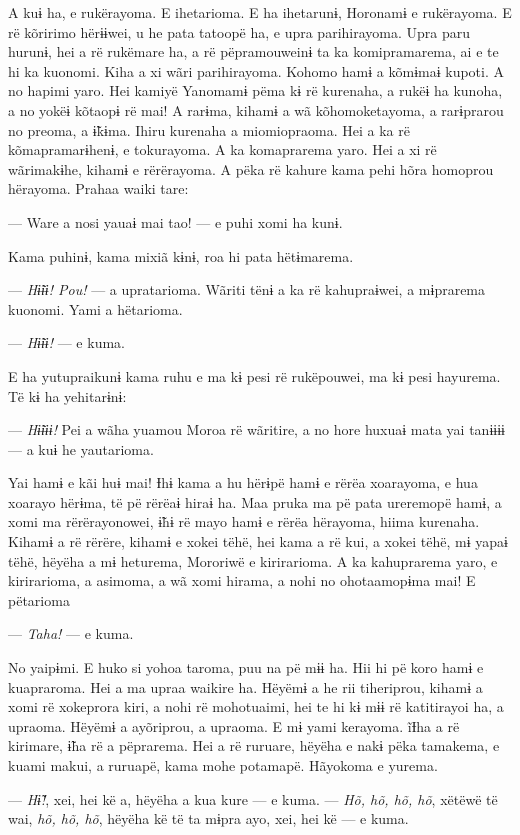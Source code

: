 A kuɨ ha, e rukërayoma. E ihetarioma. E ha ihetarunɨ, Horonamɨ e
rukërayoma. E rë kõririmo hërɨɨwei, u he pata tatoopë ha, e upra
parihirayoma. Upra paru hurunɨ, hei a rë rukëmare ha, a rë pëpramouweinɨ
ta ka komipramarema, ai e te hi ka kuonomi. Kiha a xi wãri parihirayoma.
Kohomo hamɨ a kõmɨmaɨ kupoti. A no hapimi yaro. Hei kamiyë Yanomamɨ pëma
kɨ rë kurenaha, a rukëɨ ha kunoha, a no yokëɨ kõtaopɨ rë mai! A rarɨma,
kihamɨ a wã kõhomoketayoma, a rarɨprarou no preoma, a ɨ̃kɨma. Ihiru
kurenaha a miomiopraoma. Hei a ka rë kõmapramarɨhenɨ, e tokurayoma. A ka
komaprarema yaro. Hei a xi rë wãrimakɨhe, kihamɨ e rërërayoma. A pëka rë
kahure kama pehi hõra homoprou hërayoma. Prahaa waiki tare: 

--- Ware a nosi yauaɨ mai tao! --- e puhi xomi ha kunɨ. 

Kama puhinɨ, kama mixiã kɨnɨ, roa hi pata hëtɨmarema. 

--- \textit{Hɨ̃ɨɨ! Pou!} --- a upratarioma. Wãriti tënɨ a ka rë kahupraɨwei, a
mɨprarema kuonomi. Yami a hëtarioma. 

--- \textit{Hɨ̃ɨɨ!} --- e kuma. 

E ha yutupraikunɨ kama ruhu e ma kɨ pesi rë rukëpouwei, ma kɨ pesi
hayurema. Të kɨ ha yehitarɨnɨ: 

--- \textit{Hɨ̃ɨɨɨ!} Pei a wãha yuamou Moroa rë wãritire, a no hore huxuaɨ mata yai
tanɨɨɨɨ --- a kuɨ he yautarioma. 

Yai hamɨ e kãi huɨ mai! Ɨhɨ kama a hu hërɨpë hamɨ e rërëa xoarayoma, e
hua xoarayo hërɨma, të pë rërëaɨ hiraɨ ha. Maa pruka ma pë pata
ureremopë hamɨ, a xomi ma rërërayonowei, ɨ̃hɨ rë mayo hamɨ e rërëa
hërayoma, hiima kurenaha. Kihamɨ a rë rërëre, kihamɨ e xokei tëhë, hei
kama a rë kui, a xokei tëhë, mɨ yapaɨ tëhë, hëyëha a mɨ heturema,
Mororiwë e kirirarioma. A ka kahuprarema yaro, e kirirarioma, a asimoma,
a wã xomi hirama, a nohi no ohotaamopɨma mai! E pëtarioma 

--- \textit{Taha!} --- e kuma. 

No yaipɨmi. E huko si yohoa taroma, puu na pë mɨɨ ha. Hii hi pë koro
hamɨ e kuapraroma. Hei a ma upraa waikire ha. Hëyëmɨ a he rii
tiheriprou, kihamɨ a xomi rë xokeprora kiri, a nohi rë mohotuaimi, hei
te hi kɨ mɨɨ rë katitirayoi ha, a upraoma. Hëyëmɨ a ayõriprou, a
upraoma. E mɨ yami kerayoma. ĩƗha a rë kirimare, ɨ̃ha rë a pëprarema. Hei
a rë ruruare, hëyëha e nakɨ pëka tamakema, e kuami makui, a ruruapë,
kama mohe potamapë. Hãyokoma e yurema. 

--- \textit{Hɨ̃!}, xei, hei kë a, hëyëha a kua kure --- e kuma. --- \textit{Hõ, hõ, hõ, hõ},
xëtëwë të wai, \textit{hõ, hõ, hõ}, hëyëha kë të ta mɨpra ayo, xei, hei kë --- e
kuma. 

